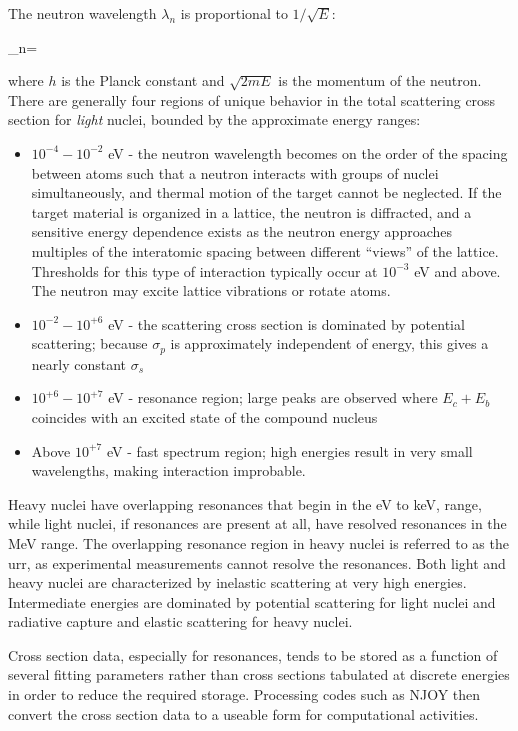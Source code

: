 The neutron wavelength \(\lambda_n\) is proportional to \(1/\sqrt{E}\):

\beq
\label{eq:NeutronWavelength}
\lambda_n=
\eeq

where \(h\) is the Planck constant and \(\sqrt{2mE}\) is the momentum of the neutron. There are generally four regions of unique behavior in the total scattering cross section for {\it light} nuclei, bounded by the approximate energy ranges:

\begin{itemize}
\item \(10^{-4}-10^{-2}\) eV - the neutron wavelength becomes on the order of the spacing between atoms such that a neutron interacts with groups of nuclei simultaneously, and thermal motion of the target cannot be neglected. If the target material is organized in a lattice, the neutron is diffracted, and a sensitive energy dependence exists as the neutron energy approaches multiples of the interatomic spacing between different ``views'' of the lattice. Thresholds for this type of interaction typically occur at \(10^{-3}\) eV and above. The neutron may excite lattice vibrations or rotate atoms. 
\item \(10^{-2}-10^{+6}\) eV - the scattering cross section is dominated by potential scattering; because \(\sigma_p\) is approximately independent of energy, this gives a nearly constant \(\sigma_s\) 
\item \(10^{+6}-10^{+7}\) eV - resonance region; large peaks are observed where \(E_c+E_b\) coincides with an excited state of the compound nucleus
\item Above \(10^{+7}\) eV - fast spectrum region; high energies result in very small wavelengths, making interaction improbable.
\end{itemize}

Heavy nuclei have overlapping resonances that begin in the eV to keV, range, while light nuclei, if resonances are present at all, have resolved resonances in the MeV range. The overlapping resonance region in heavy nuclei is referred to as the \gls{urr}, as experimental measurements cannot resolve the resonances. Both light and heavy nuclei are characterized by inelastic scattering at very high energies. Intermediate energies are dominated by potential scattering for light nuclei and radiative capture and elastic scattering for heavy nuclei. 

Cross section data, especially for resonances, tends to be stored as a function of several fitting parameters rather than cross sections tabulated at discrete energies in order to reduce the required storage. Processing codes such as NJOY then convert the cross section data to a useable form for computational activities. 

